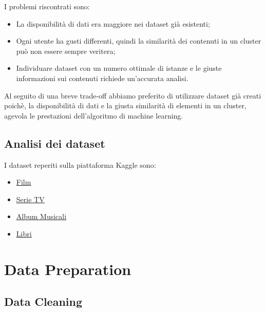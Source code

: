 \documentclass[a4paper, 12pt]{report}
\begin{document}
            I problemi riscontrati sono:
            \begin{itemize}
                \item La disponibilità di dati era maggiore nei dataset già esistenti;
                \item Ogni utente ha gusti differenti, quindi la similarità dei contenuti in un cluster può non essere sempre
                      veritera;
                \item Individuare dataset con un numero ottimale di istanze e le giuste informazioni sui contenuti richiede
                      un'accurata analisi.
            \end{itemize}
            Al seguito di una breve trade-off abbiamo preferito di utilizzare dataset già creati poichè, la disponibilità
            di dati e la giusta similarità di elementi in un cluster, agevola le prestazioni dell'algoritmo di machine learning.

        \section{Analisi dei dataset}\label{sec:analisi-dei-dataset}
            I dataset reperiti sulla piattaforma Kaggle sono:
            \begin{itemize}
                \item \href{https://www.kaggle.com/datasets/stefanoleone992/filmtv-movies-dataset?resource=download}{\underline{Film}}
                \item \href{https://www.kaggle.com/datasets/amritvirsinghx/web-series-ultimate-edition}{\underline{Serie TV}}
                \item \href{https://www.kaggle.com/datasets/lucascantu/top-5000-albums-of-all-time-spotify-features}{\underline{Album Musicali}}
                \item \href{https://www.kaggle.com/datasets/mdhamani/goodreads-books-100k}{\underline{Libri}}
            \end{itemize}


    \chapter{Data Preparation}\label{ch:data-preparation}


        \section{Data Cleaning}\label{sec:data-cleaning}
\end{document}
